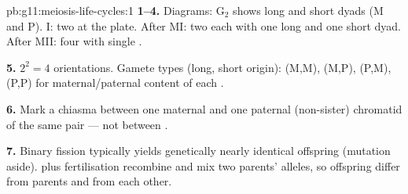\begin{solution}{pb:g11:meiosis-life-cycles:1}
\textbf{1--4.} Diagrams: G$_2$ shows long and short dyads (M and P). 
I: two  at the plate. After MI: two  each with one long and one
short dyad. After MII: four   with single .

\textbf{5.} $2^{2} = 4$ orientations. Gamete types (long, short origin):
(M,M), (M,P), (P,M), (P,P) for maternal/paternal content of each .

\textbf{6.} Mark a chiasma between one maternal and one paternal (non-sister)
chromatid of the same pair --- not between .

\textbf{7.} Binary fission typically yields genetically nearly identical
offspring (mutation aside).  plus fertilisation recombine and mix two
parents' alleles, so offspring differ from parents and from each other.
\end{solution}
